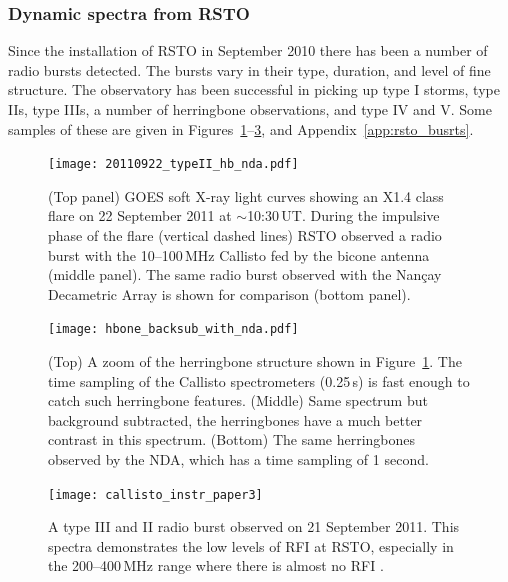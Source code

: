 \subsubsection{Dynamic spectra from RSTO}

Since the installation of RSTO in September 2010 there has been a number of radio bursts detected. The bursts vary in their type, duration, and level of fine structure. The observatory has been successful in picking up type I storms, type IIs, type IIIs, a number of herringbone observations, and type IV and V. Some samples of these are given in Figures~\ref{fig:typeII_hb}--\ref{fig:type_III}, and Appendix~\ref{app:rsto_busrts}.
\begin{figure}[!t]
\begin{center}
\texttt{[image: 20110922\_typeII\_hb\_nda.pdf]}
\caption[Callisto observations type II and herringbones]{ {\color{blue}(Top panel) GOES soft X-ray light curves showing an X1.4 class flare on 22 September 2011 at $\sim$10:30\,UT. During the impulsive phase of the flare (vertical dashed lines) RSTO observed a radio burst with the 10--100\,MHz Callisto fed by the bicone antenna (middle panel). The same radio burst observed with the Nan\c{c}ay Decametric Array is shown for comparison (bottom panel).}}
\label{fig:typeII_hb}
\end{center}

\end{figure}
\begin{figure}[!t]
\begin{center}
\texttt{[image: hbone\_backsub\_with\_nda.pdf]}
\caption[Callisto observations type II and herringbones]{{\color{blue}(Top) A zoom of the herringbone structure shown in Figure~\ref{fig:typeII_hb}. The time sampling of the Callisto spectrometers (0.25\,s) is fast enough to catch such herringbone features. (Middle) Same spectrum but background subtracted, the herringbones have a much better contrast in this spectrum. (Bottom) The same herringbones observed by the NDA, which has a time sampling of 1 second.}}
\label{fig:herringbones}
\end{center}
\end{figure}
\begin{figure}[!t]
\begin{center}
\texttt{[image: callisto\_instr\_paper3]}
\caption[Callisto observations type II and herringbones]{A type III and II radio burst observed on 21 September 2011. This spectra demonstrates the low levels of RFI at RSTO, especially in the 200--400\,MHz range where there is almost no RFI \citep{zucca2012}.}
\label{fig:type_III}
\end{center}
\end{figure}

